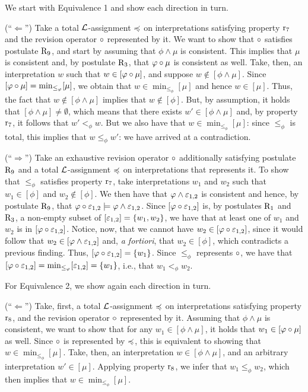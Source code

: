 \begin{prf*}{}{}%
	We start with Equivalence 1 and show each direction in turn.

	(``$\Leftarrow$'')
	Take a total $\mathcal{L}$-assignment $\preccurlyeq$ on interpretations 
	satisfying property $\mathrm{r}_{7}$
	and the revision operator $\circ$ represented by it.
	We want to show that $\circ$ satisfies postulate $\mathrm{R}_{9}$,
	and start by assuming that $\phi\land\mu$ is consistent.
	This implies that $\mu$ is consistent and, by postulate $\mathrm{R}_{3}$,
	that $\varphi \circ \mu$ is consistent as well.
	Take, then, an interpretation $w$ such that $w\in[\varphi\circ\mu]$,
	and suppose $w\notin[\phi\land\mu]$.
	Since $[\varphi\circ\mu]={\operatorname{min}}_{\le_\varphi}[\mu]$,
	we obtain that $w\in\min_{\le_\phi}[\mu]$
	and hence $w\in[\mu]$.
	Thus, the fact that $w\notin[\phi\land\mu]$
	implies that $w\notin[\phi]$.
	But, by assumption, it holds that $[\phi\land\mu]\neq\emptyset$,
	which means that there exists $w'\in[\phi\land\mu]$
	and, by property $\mathrm{r}_{7}$, it follows that $w'<_\phi w$.
	But we also have that $w\in\min_{\le_\phi}[\mu]$:
	since $\le_\phi$ is total, this implies that $w \le_\phi w'$: we have arrived at a contradiction.
	
	(``$\Rightarrow$'')
	Take an exhaustive revision operator $\circ$ additionally satisfying postulate $\mathrm{R}_{9}$
	and a total $\mathcal{L}$-assignment $\preccurlyeq$ on interpretations that represents it.
	To show that $\le_\phi$ satisfies property $\mathrm{r}_{7}$, 
	take interpretations $w_1$ and $w_2$ such that $w_1\in[\phi]$
	and $w_2\notin[\phi]$.
	We then have that $\varphi\land\varepsilon_{1,2}$ is consistent
	and hence, by postulate $\mathrm{R}_{9}$,
	that $\varphi\circ\varepsilon_{1,2}\models\varphi\land\varepsilon_{1,2}$.
	Since $[\varphi\circ\varepsilon_{1,2}]$ is, by postulates $\mathrm{R}_{1}$ and $\mathrm{R}_{3}$,
	a non-empty subset of $[\varepsilon_{1,2}]=\{w_1,w_2\}$,
	we have that at least one of $w_1$ and $w_2$ is in $[\varphi\circ\varepsilon_{1,2}]$.
	Notice, now, that we cannot have $w_2\in[\varphi\circ\varepsilon_{1,2}]$,
	since it would follow that $w_2\in[\varphi\land\varepsilon_{1,2}]$ and,
	\emph{a fortiori}, that $w_2\in[\phi]$,
	which contradicts a previous finding.
	Thus, $[\varphi\circ\varepsilon_{1,2}]=\{{w_1}\}$.
	Since $\le_\phi$ represents $\circ$, 
	we have that
	$[\varphi\circ\varepsilon_{1,2}]={\operatorname{min}}_{\le_\varphi}[\varepsilon_{1,2}]=\{w_1\}$,
	i.e., that $w_1<_\phi w_2$.		
	
	For Equivalence 2, we show again each direction in turn.

	(``$\Leftarrow$'')
	Take, first, a total $\mathcal{L}$-assignment $\preccurlyeq$ on interpretations 
	satisfying property $\mathrm{r}_{8}$,
	and the revision operator $\circ$ represented by it.
	Assuming that $\phi\land\mu$ is consistent,
	we want to show that for any $w_1\in[\phi\land\mu]$, it holds that $w_1\in[\varphi\circ\mu]$ as well.
	Since $\circ$ is represented by $\preccurlyeq$, this is equivalent to showing that
	$w\in\min_{\le_\phi}[\mu]$.
	Take, then, an interpretation $w\in[\phi\land\mu]$,
	and an arbitrary interpretation $w'\in[\mu]$.
	Applying property $\mathrm{r}_{8}$, we infer that $w_1 \le_\phi w_2$,
	which then implies that $w\in\min_{\le_\phi}[\mu]$.


\end{prf*}

